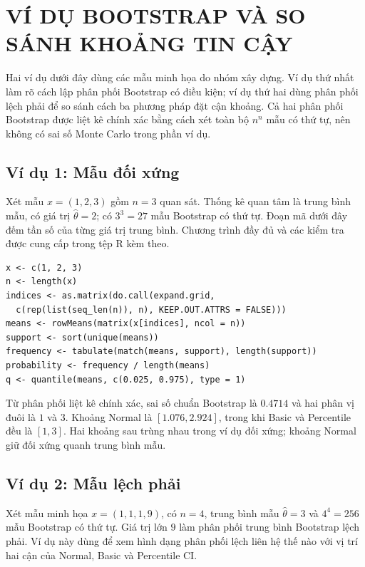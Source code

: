 \section{VÍ DỤ BOOTSTRAP VÀ SO SÁNH KHOẢNG TIN CẬY}
\label{sec:examples}

Hai ví dụ dưới đây dùng các mẫu minh họa do nhóm xây dựng. Ví dụ thứ nhất
làm rõ cách lập phân phối Bootstrap có điều kiện; ví dụ thứ hai dùng phân
phối lệch phải để so sánh cách ba phương pháp đặt cận khoảng. Cả hai phân
phối Bootstrap được liệt kê chính xác bằng cách xét toàn bộ $n^n$ mẫu có
thứ tự, nên không có sai số Monte Carlo trong phần ví dụ.

\subsection{Ví dụ 1: Mẫu đối xứng}

Xét mẫu $x=(1,2,3)$ gồm $n=3$ quan sát. Thống kê quan tâm là trung bình mẫu, có giá trị $\hat\theta=2$; có $3^3=27$ mẫu Bootstrap có thứ tự. Đoạn mã dưới đây đếm tần số của từng giá trị trung bình. Chương trình đầy đủ và các kiểm tra được cung cấp trong tệp R kèm theo.



\begin{lstlisting}[style=Rstyle, caption={Bootstrap đối xứng}]
x <- c(1, 2, 3)
n <- length(x)
indices <- as.matrix(do.call(expand.grid,
  c(rep(list(seq_len(n)), n), KEEP.OUT.ATTRS = FALSE)))
means <- rowMeans(matrix(x[indices], ncol = n))
support <- sort(unique(means))
frequency <- tabulate(match(means, support), length(support))
probability <- frequency / length(means)
q <- quantile(means, c(0.025, 0.975), type = 1)
\end{lstlisting}

Từ phân phối liệt kê chính xác, sai số chuẩn Bootstrap là $0.4714$ và hai
phân vị đuôi là $1$ và $3$. Khoảng Normal là $[1.076,2.924]$, trong khi
Basic và Percentile đều là $[1,3]$. Hai khoảng sau trùng nhau trong ví dụ
đối xứng; khoảng Normal giữ đối xứng quanh trung bình mẫu.

\subsection{Ví dụ 2: Mẫu lệch phải}
\label{sec:example-skewed}

Xét mẫu minh họa $x=(1,1,1,9)$, có $n=4$, trung bình mẫu $\hat\theta=3$
và $4^4=256$ mẫu Bootstrap có thứ tự. Giá trị lớn $9$ làm phân phối trung
bình Bootstrap lệch phải. Ví dụ này dùng để xem hình dạng phân phối lệch
liên hệ thế nào với vị trí hai cận của Normal, Basic và Percentile CI.

